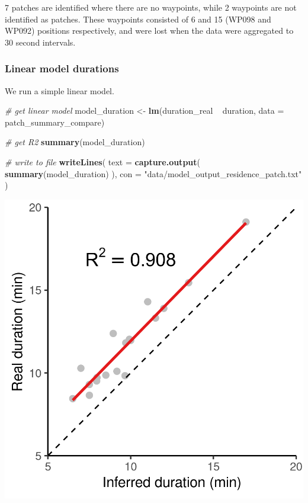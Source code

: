 \documentclass[]{scrartcl}
\newenvironment{Shaded}{}{}
\newcommand{\CommentTok}[1]{\textcolor[rgb]{0.38,0.63,0.69}{\textit{#1}}}
\newcommand{\DataTypeTok}[1]{\textcolor[rgb]{0.56,0.13,0.00}{#1}}
\newcommand{\KeywordTok}[1]{\textcolor[rgb]{0.00,0.44,0.13}{\textbf{#1}}}
\newcommand{\NormalTok}[1]{#1}
\newcommand{\OperatorTok}[1]{\textcolor[rgb]{0.40,0.40,0.40}{#1}}
\newcommand{\StringTok}[1]{\textcolor[rgb]{0.25,0.44,0.63}{#1}}
\begin{document}
7 patches are identified where there are no waypoints, while 2 waypoints are not identified as patches. These waypoints consisted of 6 and 15 (WP098 and WP092) positions respectively, and were lost when the data were aggregated to 30 second intervals.

\hypertarget{linear-model-durations}{%
\subsubsection{Linear model durations}\label{linear-model-durations}}

We run a simple linear model.

\begin{Shaded}
\begin{Highlighting}[]
\CommentTok{# get linear model}
\NormalTok{model_duration <-}\StringTok{ }\KeywordTok{lm}\NormalTok{(duration_real }\OperatorTok{~}\StringTok{ }\NormalTok{duration,}
                     \DataTypeTok{data =}\NormalTok{ patch_summary_compare)}

\CommentTok{# get R2}
\KeywordTok{summary}\NormalTok{(model_duration)}

\CommentTok{# write to file}
\KeywordTok{writeLines}\NormalTok{(}
  \DataTypeTok{text =} \KeywordTok{capture.output}\NormalTok{(}
    \KeywordTok{summary}\NormalTok{(model_duration)}
\NormalTok{  ),}
  \DataTypeTok{con =} \StringTok{"data/model_output_residence_patch.txt"}
\NormalTok{)}
\end{Highlighting}
\end{Shaded}

\includegraphics{figures/fig_calib_lm_duration.png}
\end{document}
